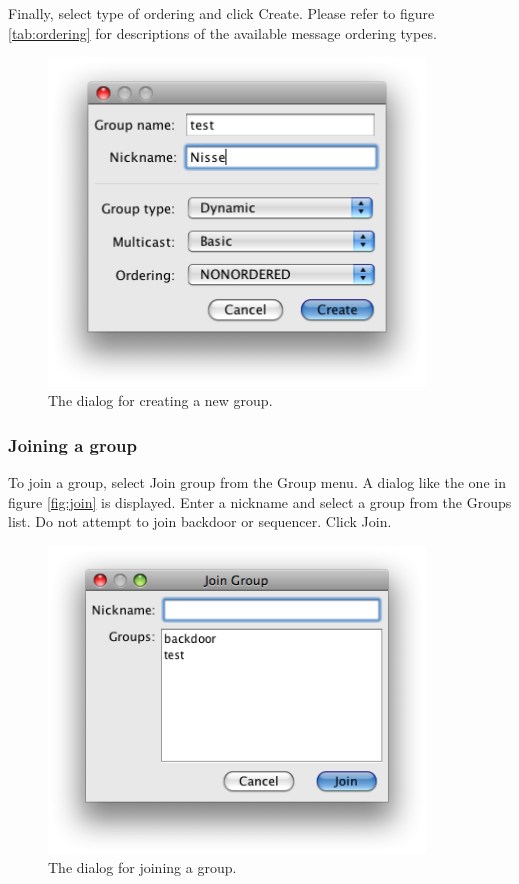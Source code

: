 \documentclass[english]{article}
\begin{document}
Finally, select type of ordering and click Create. Please refer to figure \vref{tab:ordering} for descriptions of the available message ordering types.


\begin{figure}
\centering \includegraphics[width=10cm]{gui2.png}
\caption{The dialog for creating a new group.}
\label{fig:creat}
\end{figure}


\subsubsection{Joining a group}
To join a group, select Join group from the Group menu. A dialog like the one in figure \vref{fig:join} is displayed. Enter a nickname and select a group from the Groups list. Do not attempt to join backdoor or sequencer. Click Join.

\begin{figure}
\centering \includegraphics[width=10cm]{gui4.png}
\caption{The dialog for joining a group.}
\label{fig:join}
\end{figure}
\end{document}
